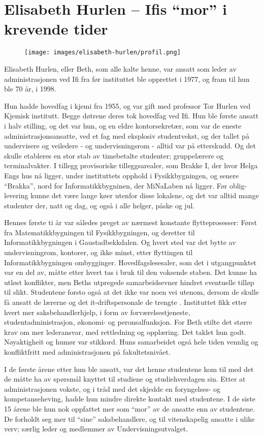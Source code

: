 \chapter[Elisabeth Hurlen]{Elisabeth Hurlen – Ifis ``mor'' i krevende tider}

\author{Skrevet av Narve Trædal}

\begin{figure}
	\texttt{[image: images/elisabeth-hurlen/profil.png]}
	\label{fig:elisabeth-hurlen}
\end{figure}

Elisabeth Hurlen, eller Beth, som alle kalte henne, var ansatt som leder av administrasjonen ved Ifi fra før instituttet ble opprettet i 1977, og fram til hun ble 70 år, i 1998.

Hun hadde hovedfag i kjemi fra 1955, og var gift med professor Tor Hurlen ved Kjemisk institutt. Begge døtrene deres tok hovedfag ved Ifi. Hun ble første ansatt i halv stilling, og det var hun, og en eldre kontorsekretær, som var de eneste administrasjonsansatte, ved et fag med eksplosiv studentvekst, og der tallet på undervisere og veiledere - og undervisningsrom - alltid var på etterskudd. Og det skulle etableres en stor stab av timebetalte studenter; gruppelærere og terminalvakter. I tillegg provisoriske tilleggsarealer, som Brakke I, der hvor Helga Engs hus nå ligger, under instituttets opphold i Fysikkbygningen, og senere ``Brakka'', nord for Informatikkbygninen, der MiNaLaben nå ligger. Før oblig-levering kunne det være lange køer utenfor disse lokalene, og det var alltid mange studenter der, natt og dag, og også i alle helger, påske og jul.

Hennes første ti år var således preget av nærmest konstante flytteprosesser: Først fra Matematikkbygningen til Fysikkbygningen, og deretter til Informatikkbygningen i Gaustadbekkdalen. Og hvert sted var det bytte av undervisningrom, kontorer, og ikke minst, etter flyttingen til Informatikkbygningen ombygginger. Hovedfagslesesaler, som det i utgangpunktet var en del av, måtte etter hvert tas i bruk til den voksende staben. Det kunne ha utløst konflikter, men Beths utpregede samarbeidsevner hindret eventuelle tilløp til slikt. Studentene forsto også at det ikke var noen vei utenom, dersom de skulle få ansatt de lærerne og det it-driftspersonale de trengte . Instituttet fikk etter hvert mer saksbehandlerhjelp, i form av forværelsestjeneste, studentadministrasjon, økonomi- og peronsalfunksjon. For Beth stilte det større krav om mer lederansvar, med rettledning og opplæring. Det taklet hun godt. Nøyaktigheit og humør var stikkord. Huns samarbeidet også hele tiden vennlig og konfliktfritt med administrasjonen på fakultetsnivået.

I de første årene etter hun ble ansatt, var det henne studentene kom til med det de måtte ha av spørsmål knyttet til studiene og studiehverdagen sin. Etter at administrasjonen vokste, og i tråd med det skjedde en foryngelses- og kompetanseheving, hadde hun mindre direkte kontakt med studentene. I de siste 15 årene ble hun nok oppfattet mer som ``mor'' av de ansatte enn av studentene. De forholdt seg mer til ``sine'' saksbehandlere, og til vitenskapelig ansatte i ulike verv; særlig leder og medlemmer av Undervisningsutvalget.
